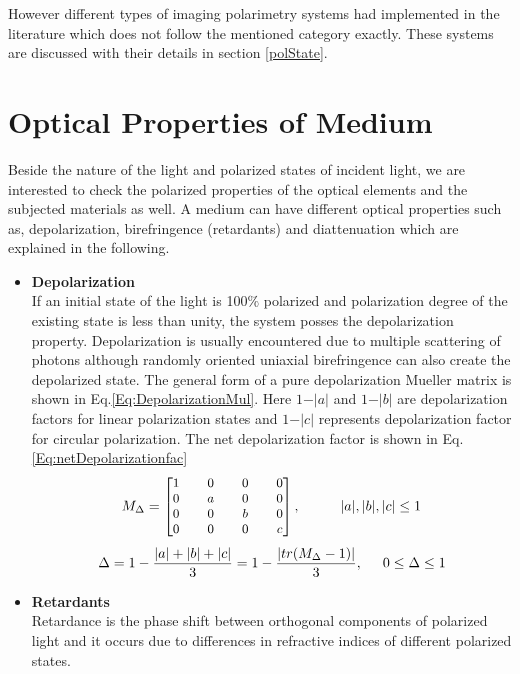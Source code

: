 \documentclass[oneside,a4,12p]{report} %
\begin{document}
However different types of imaging polarimetry systems had implemented in the literature which does not follow the mentioned category exactly. These systems are discussed with their details in section \ref{polState}.

\section{Optical Properties of Medium}

Beside the nature of the light and polarized states of incident light, we are interested to check the polarized properties of the optical elements and the subjected materials as well. A medium can have different optical properties such as, depolarization, birefringence (retardants) and diattenuation which are explained in the following. 
	\begin{itemize}
	\item \textbf{Depolarization}\\
	If an initial state of the light is 100$\%$ polarized and polarization degree of the existing state is less than unity, the system posses the depolarization property. Depolarization is usually encountered due to multiple scattering of photons although randomly oriented uniaxial birefringence can also create the depolarized state. The general form of a pure depolarization Mueller matrix is shown in Eq.\ref{Eq:DepolarizationMul}. Here $1-\vert a \vert$ and $1-\vert b \vert$ are depolarization factors for linear polarization states and $1-\vert c \vert$ represents depolarization factor for circular polarization. The net depolarization factor is shown in Eq. \ref{Eq:netDepolarizationfac}
	\begin{equation}\label{Eq:DepolarizationMul}
	\small
		M_{\Delta} = \begin{bmatrix}
	1 & & 0 & & 0 & & 0\\0 && a && 0 && 0\\ 0 && 0 && b && 0\\ 0 && 0 && 0 && c
	\end{bmatrix} , \hspace{1 cm} \vert a \vert, \vert b \vert, \vert c \vert \leq 1
	\end{equation}
	\begin{equation}\label{Eq:netDepolarizationfac}
	\small
		\Delta  = 1 - \frac{\vert a \vert + \vert b \vert + \vert c \vert }{3} = 1 - \frac{\vert tr (M_{\Delta}-1)\vert}{3} , \hspace{0.5 cm} 0\leq \Delta \leq 1
		\end{equation}		
	\item \textbf{Retardants}\\	
	Retardance is the phase shift between orthogonal components of polarized light and it occurs due to differences in refractive indices of different polarized states. 
	

\end{itemize}
\end{document}
